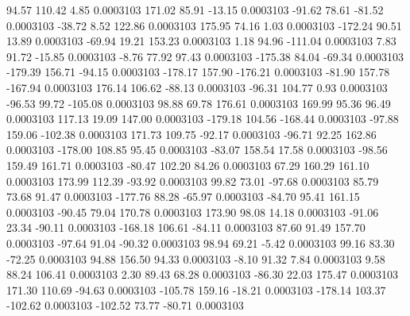       94.57      110.42        4.85     0.0003103
      171.02       85.91      -13.15     0.0003103
      -91.62       78.61      -81.52     0.0003103
      -38.72        8.52      122.86     0.0003103
      175.95       74.16        1.03     0.0003103
     -172.24       90.51       13.89     0.0003103
      -69.94       19.21      153.23     0.0003103
        1.18       94.96     -111.04     0.0003103
        7.83       91.72      -15.85     0.0003103
       -8.76       77.92       97.43     0.0003103
     -175.38       84.04      -69.34     0.0003103
     -179.39      156.71      -94.15     0.0003103
     -178.17      157.90     -176.21     0.0003103
      -81.90      157.78     -167.94     0.0003103
      176.14      106.62      -88.13     0.0003103
      -96.31      104.77        0.93     0.0003103
      -96.53       99.72     -105.08     0.0003103
       98.88       69.78      176.61     0.0003103
      169.99       95.36       96.49     0.0003103
      117.13       19.09      147.00     0.0003103
     -179.18      104.56     -168.44     0.0003103
      -97.88      159.06     -102.38     0.0003103
      171.73      109.75      -92.17     0.0003103
      -96.71       92.25      162.86     0.0003103
     -178.00      108.85       95.45     0.0003103
      -83.07      158.54       17.58     0.0003103
      -98.56      159.49      161.71     0.0003103
      -80.47      102.20       84.26     0.0003103
       67.29      160.29      161.10     0.0003103
      173.99      112.39      -93.92     0.0003103
       99.82       73.01      -97.68     0.0003103
       85.79       73.68       91.47     0.0003103
     -177.76       88.28      -65.97     0.0003103
      -84.70       95.41      161.15     0.0003103
      -90.45       79.04      170.78     0.0003103
      173.90       98.08       14.18     0.0003103
      -91.06       23.34      -90.11     0.0003103
     -168.18      106.61      -84.11     0.0003103
       87.60       91.49      157.70     0.0003103
      -97.64       91.04      -90.32     0.0003103
       98.94       69.21       -5.42     0.0003103
       99.16       83.30      -72.25     0.0003103
       94.88      156.50       94.33     0.0003103
       -8.10       91.32        7.84     0.0003103
        9.58       88.24      106.41     0.0003103
        2.30       89.43       68.28     0.0003103
      -86.30       22.03      175.47     0.0003103
      171.30      110.69      -94.63     0.0003103
     -105.78      159.16      -18.21     0.0003103
     -178.14      103.37     -102.62     0.0003103
     -102.52       73.77      -80.71     0.0003103
